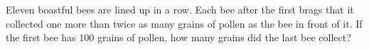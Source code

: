 Eleven boastful bees are lined up in a row. Each bee after the first brags that it collected one more than twice as many grains of pollen as the bee in front of it. If the first bee has $100$ grains of pollen, how many grains did the last bee collect?
